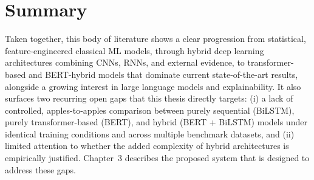 \section{Summary}

Taken together, this body of literature shows a clear progression from statistical, feature-engineered classical ML models, through hybrid deep learning architectures combining CNNs, RNNs, and external evidence, to transformer-based and BERT-hybrid models that dominate current state-of-the-art results, alongside a growing interest in large language models and explainability. It also surfaces two recurring open gaps that this thesis directly targets: (i) a lack of controlled, apples-to-apples comparison between purely sequential (BiLSTM), purely transformer-based (BERT), and hybrid (BERT + BiLSTM) models under identical training conditions and across multiple benchmark datasets, and (ii) limited attention to whether the added complexity of hybrid architectures is empirically justified. Chapter~3 describes the proposed system that is designed to address these gaps.
